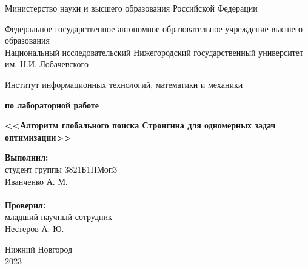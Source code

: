 \documentclass{article}
\begin{document}
\begin{titlepage}

\begin{center}
Министерство науки и высшего образования Российской Федерации
\end{center}

\begin{center}
Федеральное государственное автономное образовательное учреждение высшего образования \\
Национальный исследовательский Нижегородский государственный университет им. Н.И. Лобачевского
\end{center}

\begin{center}
Институт информационных технологий, математики и механики
\end{center}

\vspace{4em}

\begin{center}
\textbf{ по лабораторной работе} \\
\end{center}
\begin{center}
\textbf{\Large<<Алгоритм глобального поиска Стронгина для одномерных задач оптимизации>>} \\
\end{center}

\vspace{4em}

\newbox{\lbox}
\newlength{\maxl}
\setlength{\maxl}{\wd\lbox}
\hfill\parbox{7cm}{
\hspace*{5cm}\hspace*{-5cm}\textbf{Выполнил:} \\ студент группы 3821Б1ПМоп3\\Иванченко А. М.\\
\\
\hspace*{5cm}\hspace*{-5cm}\textbf{Проверил:}\\ младший научный сотрудник\\Нестеров А. Ю.\\
}
\vspace{\fill}

\begin{center} Нижний Новгород \\ 2023 \end{center}

\end{titlepage}
\setcounter{page}{2}
\end{document}
